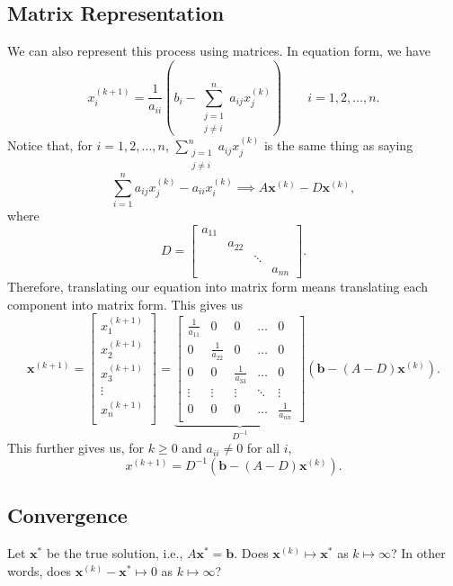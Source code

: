 \documentclass[letterpaper]{article}
\newcommand{\0}{\mathbf{0}}
\renewcommand{\b}{\mathbf{b}}
\newcommand{\x}{\mathbf{x}}
\begin{document}
\subsection{Matrix Representation}
We can also represent this process using matrices. In equation form, we have 
\[x_{i}^{(k + 1)} = \frac{1}{a_{ii}} \left(b_{i} - \sum_{\substack{j = 1 \\ j \neq i}}^n a_{ij}x_{j}^{(k)}\right) \qquad i = 1, 2, \hdots, n.\]
Notice that, for $i = 1, 2, \hdots, n$, $\sum_{\substack{j = 1 \\ j \neq i}}^n a_{ij}x_{j}^{(k)}$ is the same thing as saying 
\[\sum_{i = 1}^{n} a_{ij}x_{j}^{(k)} - a_{ii}x_i^{(k)} \implies A\x^{(k)} - D\x^{(k)},\]
where 
\[D = \begin{bmatrix}
    a_{11} &        &        &        \\
           & a_{22} &        &        \\  
           &        & \ddots &        \\  
           &        &        & a_{nn}   
\end{bmatrix}.\]
Therefore, translating our equation into matrix form means translating each component into matrix form. This gives us  
\[\x^{(k + 1)} = \begin{bmatrix}
    x_1^{(k + 1)} \\ 
    x_2^{(k + 1)} \\ 
    x_3^{(k + 1)} \\
    \vdots \\  
    x_n^{(k + 1)} \\ 
\end{bmatrix} = \underbrace{\begin{bmatrix}
    \frac{1}{a_{11}} & 0 & 0 & \hdots & 0 \\ 
    0 & \frac{1}{a_{22}} & 0 & \hdots & 0 \\ 
    0 & 0 & \frac{1}{a_{33}} & \hdots & 0 \\
    \vdots & \vdots & \vdots & \ddots & \vdots \\  
    0 & 0 & 0 & \hdots & \frac{1}{a_{nn}}
\end{bmatrix}}_{D^{-1}} \left(\b - (A - D)\x^{(k)}\right).\]
This further gives us, for $k \geq 0$ and $a_{ii} \neq 0$ for all $i$, 
\[\boxed{x^{(k + 1)} = D^{-1}(\b - (A - D)\x^{(k)})}.\]

\subsection{Convergence}
Let $\x^*$ be the true solution, i.e., $A\x^* = \b$. Does $\x^{(k)} \mapsto \x^*$ as $k \mapsto \infty$? In other words, does $\x^{(k)} - \x^* \mapsto 0$ as $k \mapsto \infty$? 
\end{document}
